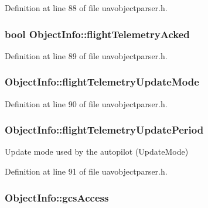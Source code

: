 Definition at line 88 of file uavobjectparser.\-h.

\hypertarget{struct_object_info_a8eb921a735b0e225232754c57b4be129}{
\subsubsection[{flight\-Telemetry\-Acked}]{\setlength{\rightskip}{0pt plus 5cm}bool Object\-Info\-::flight\-Telemetry\-Acked}}\label{struct_object_info_a8eb921a735b0e225232754c57b4be129}


Definition at line 89 of file uavobjectparser.\-h.

\hypertarget{struct_object_info_ac0c493bc75ddcfa7a016cae168641caf}{
\subsubsection[{flight\-Telemetry\-Update\-Mode}]{ Object\-Info\-::flight\-Telemetry\-Update\-Mode}}\label{struct_object_info_ac0c493bc75ddcfa7a016cae168641caf}


Definition at line 90 of file uavobjectparser.\-h.

\hypertarget{struct_object_info_a659d50fa67292fdf892813c1b872cf0c}{
\subsubsection[{flight\-Telemetry\-Update\-Period}]{ Object\-Info\-::flight\-Telemetry\-Update\-Period}}\label{struct_object_info_a659d50fa67292fdf892813c1b872cf0c}
Update mode used by the autopilot (Update\-Mode) 

Definition at line 91 of file uavobjectparser.\-h.

\hypertarget{struct_object_info_a6c262011c1c6ac81a11c042c34dcd4ec}{
\subsubsection[{gcs\-Access}]{ Object\-Info\-::gcs\-Access}}\label{struct_object_info_a6c262011c1c6ac81a11c042c34dcd4ec}



